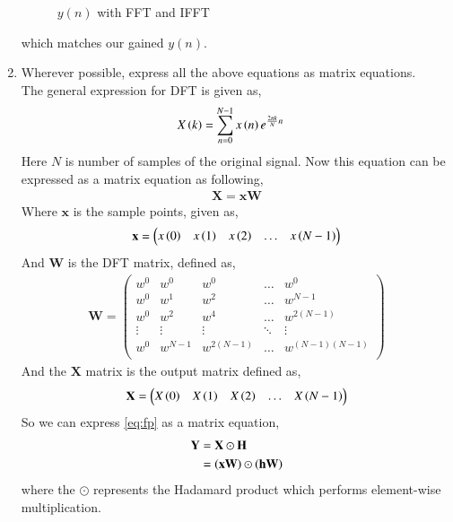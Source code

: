 \documentclass[journal,12pt,twocolumn]{IEEEtran}
\theoremstyle{remark}
\begin{document}
\begin{enumerate}[label=\thesection.\arabic*]
\begin{figure}[h!]
    \caption{$y(n)$ with FFT and IFFT}
\end{figure}
which matches our gained $y(n)$.
\vspace{1cm}
\item Wherever possible, express all the above equations as matrix equations.\\
\solution
The general expression for DFT is given as,
\begin{align}
    X\left(k\right)&=\sum_{n=0}^{N-1}x\left(n\right)e^{\frac{2\pi k}{N}n}
\end{align}
Here $N$ is number of samples of the original signal.
Now this equation can be expressed as a matrix equation as following,
\begin{align}
    \mathbf{X}=\mathbf{x}\mathbf{W}
\end{align}
Where $\mathbf{x}$ is the sample points, given as,
\begin{align}
    \mathbf{x}=\begin{pmatrix}
    x\left(0\right) & x\left(1\right) & x\left(2\right) & \ldots & x\left(N-1\right)
    \end{pmatrix}
\end{align}
And $\mathbf{W}$ is the DFT matrix, defined as,
\begin{align}
    \mathbf{W}=\begin{pmatrix}
        w^0 & w^0 & w^0 & \ldots & w^0 \\
        w^0 & w^1 & w^2 & \ldots & w^{N-1} \\
        w^0 & w^2 & w^4 & \ldots & w^{2(N-1)} \\
        \vdots & \vdots & \vdots & \ddots & \vdots \\
        w^0 & w^{N-1} & w^{2(N-1)} & \ldots & w^{(N-1)(N-1)}\\
    \end{pmatrix}
\end{align}
And the $\mathbf{X}$ matrix is the output matrix defined as,
\begin{align}
    \mathbf{X}=\begin{pmatrix}
    X\left(0\right) & X\left(1\right) & X\left(2\right) & \ldots & X\left(N-1\right)
    \end{pmatrix}
\end{align}
So we can express \eqref{eq:fp} as a matrix equation,
\begin{align}
	\mathbf{Y} &= \mathbf{X}\odot\mathbf{H} \\
        &= \left(\mathbf{x}\mathbf{W}\right)\odot\left(\mathbf{h}\mathbf{W}\right)
\end{align}
where the $\odot$ represents the Hadamard product which performs element-wise multiplication.

\end{enumerate}
\end{document}
